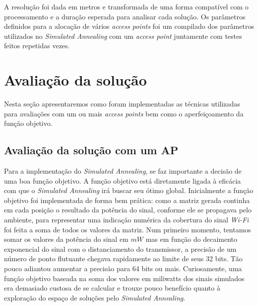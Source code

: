 \documentclass[
	12pt,				%
	twoside,			%
	a4paper,			%
	english,			%
	french,				%
	spanish,			%
	brazil				%
	]{abntex2}
\begin{document}
A resolução foi dada em metros e transformada de uma forma compatível
com o processamento e a duração esperada para analisar cada solução. Os
parâmetros definidos para a alocação de vários \emph{access points} foi
um compilado dos parâmetros utilizados no \emph{Simulated Annealing} com
um \emph{access point} juntamente com testes feitos repetidas vezes.

\section{Avaliação da solução}\label{avaliauxe7uxe3o-da-soluuxe7uxe3o}

Nesta seção apresentaremos como foram implementadas as técnicas
utilizadas para avaliações com um ou mais \emph{access points} bem como
o aperfeiçoamento da função objetivo.

\subsection{Avaliação da solução com um AP}\label{sec:avalia_one_ap}

Para a implementação do \emph{Simulated Annealing}, se faz importante a
decisão de uma boa função objetivo. A função objetivo está diretamente
ligada à eficácia com que o \emph{Simulated Annealing} irá buscar seu
ótimo global. Inicialmente a função objetivo foi implementada de forma
bem prática: como a matriz gerada continha em cada posição o resultado
da potência do sinal, conforme ele se propagava pelo ambiente, para
representar uma indicação numérica da cobertura do sinal \emph{Wi-Fi}
foi feita a soma de todos os valores da matriz. Num primeiro momento,
tentamos somar os valores da potência do sinal em \(mW\) mas em função
do decaimento exponencial do sinal com o distanciamento do transmissor,
a precisão de um número de ponto flutuante chegava rapidamente ao limite
de seus 32 bits. Tão pouco adiantou aumentar a precisão para 64 bits ou
mais. Curiosamente, uma função objetivo baseada na soma dos valores em
miliwatts dos sinais simulados era demasiado custosa de se calcular e
trouxe pouco benefício quanto à exploração do espaço de soluções pelo
\emph{Simulated Annealing}.
\end{document}
